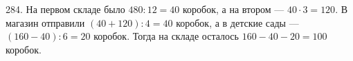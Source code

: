 284. На первом складе было $480:12=40$ коробок, а на втором --- $40\cdot3=120.$ В магазин отправили $(40+120):4=40$ коробок, а в детские сады --- $(160-40):6=20$ коробок. Тогда на складе осталось $160-40-20=100$ коробок.\\
